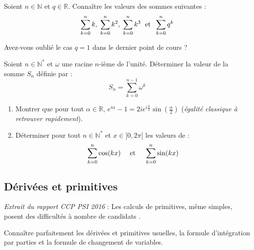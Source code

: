 \documentclass[a4paper,twoside,french,11pt]{VcCours}
\begin{document}
\begin{ptc}{}
Soient $n \in \mathbb{N}$ et $q \in \mathbb{R}$. Connaître les valeurs des sommes suivantes :
$$ \sum_{k=0}^n k, \;  \sum_{k=0}^n k^2, \; \sum_{k=0}^n k^3  \; \hbox{ et } \; \sum_{k=0}^n q^k$$
\end{ptc}

\begin{Exercice}{}
  Avez-vous oublié le cas $q=1$ dans le dernier point de cours ?
\end{Exercice} 

\begin{Exercice}{}
  Soient $n \in \mathbb{N}^*$ et $\omega $ une racine $n$-ième de l'unité. Déterminer la valeur de la somme $S_n$ définie par :$$ S_n= \sum_{k=0}^{n-1} \omega^k$$
\end{Exercice} 

\begin{Exercice}{}
  \begin{enumerate}
    \item Montrer que pour tout $\alpha \in \mathbb{R}$, $e^{i \alpha}-1 = 2ie^{i \frac{\alpha}{2}}\sin \left(\frac{\alpha}{2}\right)$ (\textit{égalité classique à retrouver rapidement}).
    \item Déterminer pour tout $n \in \mathbb{N}^*$ et $x \in ]0, 2\pi [$ les valeurs de :
    $$ \sum_{k=0}^n \cos(kx) \quad \hbox{ et }  \quad\sum_{k=0}^n \sin(kx) $$
  \end{enumerate}
\end{Exercice} 

\subsection{Dérivées et primitives}

\textit{Extrait du rapport CCP PSI 2016} : \og Les calculs de primitives, même simples, posent des difficultés à nombre de candidats \fg{} .

\begin{ptc}{}
	Connaître parfaitement les dérivées et primitives usuelles, la formule d'intégration par parties et la formule de changement de variables.
\end{ptc}
\end{document}
